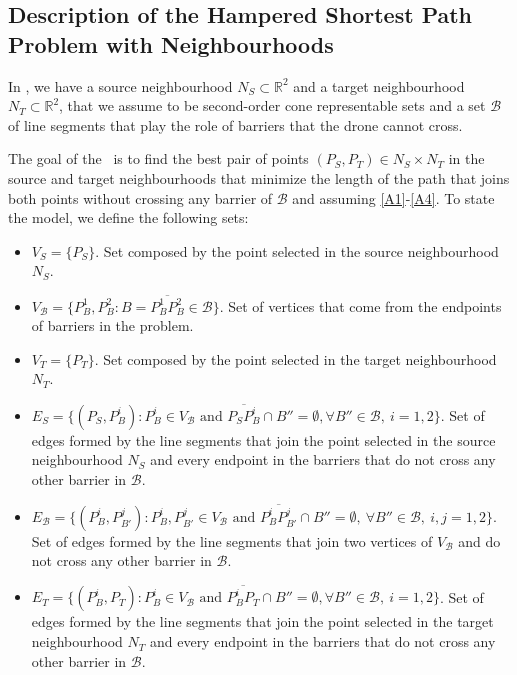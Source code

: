 \documentclass[a4paper,  review, authoryear, 1p.]{elsarticle}
\newcommand{\SPPN}{{\sf{H-SPPN}\xspace }}
\newcommand{\B}{{\mathcal B}}
\newcommand{\VB}{{V^{}_{\mathcal B}}}
\newcommand{\EB}{{E^{}_{\mathcal B}}}
\newcommand{\VS}{{V^{}_{S}}}
\newcommand{\ES}{{E^{}_{S}}}
\newcommand{\VT}{{V^{}_{T}}}
\newcommand{\ET}{{E^{}_{T}}}
\begin{document}
		
		\subsection{Description of the Hampered Shortest Path Problem with Neighbourhoods}\label{subsection:descriptionHSPPN}
		In \SPPN, we have a source neighbourhood $N_S\subset\mathbb R^2$ and a target neighbourhood $N_T\subset\mathbb R^2$, that we assume to be second-order cone representable sets and a set $\mathcal B$ of line segments that play the role of barriers that the drone cannot cross. 
		
		The goal of the \SPPN \ is to find the best pair of points $(P_{S}, P_{T})\in N_S\times N_T$ in the source and target neighbourhoods that minimize the length of the path that joins both points without crossing any barrier of $\mathcal B$ and assuming \ref{A1}-\ref{A4}. To state the model,  we define the following sets:
		\begin{itemize}
			\item $\VS=\{P_S\}$. Set composed by the point selected in the source neighbourhood $N_S$.
			\item $\VB=\{P^1_B, P^2_B:B=\overline{P^1_B P^2_B}\in \mathcal B\}$. Set of vertices that come from the endpoints of barriers in the problem.
			\item $\VT=\{P^{}_T\}$. Set composed by the point selected in the target neighbourhood $N_T$.
			\item $\ES=\{(P_S, P^i_{B}):P^i_B\in V_\B\text{ and } \overline{P_SP^i_B}\cap B''=\emptyset,\forall B''\in\B,\:i=1,2\}$. Set of edges formed by the line segments that join the point selected in the source neighbourhood $N_S$ and every endpoint in the barriers that do not cross any other barrier in $\B$.
			\item $\EB=\{(P^{i}_B, P^{j}_{B'}):P^i_B, P^j_{B'}\in \VB \text{ and } \overline{P^i_B P^j_{B'}}\cap B''=\emptyset,\:\forall B''\in\mathcal B,\:i, j=1,2\}$. Set of edges formed by the line segments that join two vertices of $V_{\mathcal B}$ and do not cross any other barrier in $\B$.
			\item $\ET=\{(P^i_{B}, P^{}_T):P^i_B\in V_\B\text{ and } \overline{P^i_BP^{}_T}\cap B''=\emptyset,\forall B''\in\B,\:i=1,2\}$. Set of edges formed by the line segments that join the point selected in the target neighbourhood $N_T$ and every endpoint in the barriers that do not cross any other barrier in $\B$.
		\end{itemize} 
		
\end{document}
